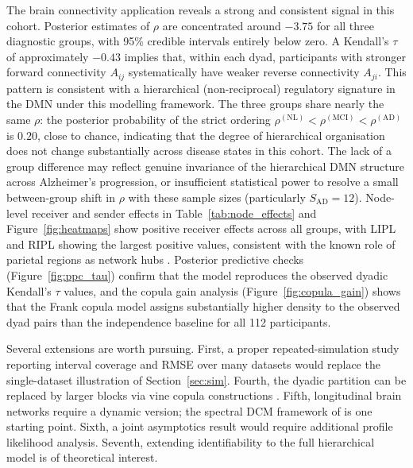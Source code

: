 \documentclass[12pt]{article}
\begin{document}
The brain connectivity application reveals a strong and consistent signal
in this cohort.
Posterior estimates of $\rho$ are concentrated around $-3.75$ for all three
diagnostic groups, with 95\% credible intervals entirely below zero.  A
Kendall's $\tau$ of approximately $-0.43$ implies that, within each dyad,
participants with stronger forward connectivity $A_{ij}$ systematically have
weaker reverse connectivity $A_{ji}$.  This pattern is consistent with a
hierarchical (non-reciprocal) regulatory signature in the DMN under this
modelling framework.
The three groups share nearly the same $\rho$: the posterior probability of
the strict ordering $\rho^{(\mathrm{NL})} < \rho^{(\mathrm{MCI})} <
\rho^{(\mathrm{AD})}$ is $0.20$, close to chance, indicating that the
degree of hierarchical organisation does not change substantially across
disease states in this cohort.  The lack of a group difference may reflect
genuine invariance of the hierarchical DMN structure across Alzheimer's
progression, or insufficient statistical power to resolve a small
between-group shift in $\rho$ with these sample sizes (particularly
$S_{\mathrm{AD}} = 12$).  Node-level receiver and sender effects
in Table~\ref{tab:node_effects} and Figure~\ref{fig:heatmaps} show positive receiver
effects across all groups, with LIPL and RIPL showing the largest positive
values, consistent with the known role of parietal regions as network hubs
\citep{huang2022}.  Posterior predictive checks (Figure~\ref{fig:ppc_tau})
confirm that the model reproduces the observed dyadic Kendall's $\tau$
values, and the copula gain analysis (Figure~\ref{fig:copula_gain}) shows
that the Frank copula model assigns substantially higher density to the
observed dyad pairs than the independence baseline for all 112 participants.

Several extensions are worth pursuing.  First, a proper repeated-simulation study
reporting interval coverage and RMSE over many datasets would replace the
single-dataset illustration of Section~\ref{sec:sim}.  Fourth, the dyadic
partition can be replaced by larger blocks via vine copula constructions
\citep{czado2025}.  Fifth, longitudinal brain networks require a dynamic
version; the spectral DCM framework of \citet{nie2020} is one starting point.
Sixth, a joint asymptotics result would require additional profile likelihood
analysis.  Seventh, extending identifiability to the full hierarchical model
is of theoretical interest.
\end{document}
